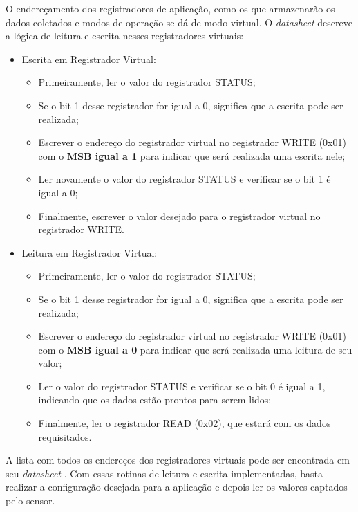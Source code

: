 \documentclass[../monografia.tex]{subfiles}
\begin{document}
O endereçamento dos registradores de aplicação, como os que armazenarão os dados coletados e modos de operação se dá de modo virtual. O \textit{datasheet} descreve a lógica de leitura e escrita nesses registradores virtuais:

\begin{itemize}
\item Escrita em Registrador Virtual:
	\begin{itemize}
		\item Primeiramente, ler o valor do registrador STATUS;
		\item Se o bit 1 desse registrador for igual a 0, significa que a escrita pode ser realizada;
		\item Escrever o endereço do registrador virtual no registrador WRITE (0x01) com o \textbf{MSB igual a 1} para indicar que será realizada uma escrita nele;
		\item Ler novamente o valor do registrador STATUS e verificar se o bit 1 é igual a 0;
		\item Finalmente, escrever o valor desejado para o registrador virtual no registrador WRITE.
	\end{itemize}
	
\item Leitura em Registrador Virtual:
	\begin{itemize}
		\item Primeiramente, ler o valor do registrador STATUS;
		\item Se o bit 1 desse registrador for igual a 0, significa que a escrita pode ser realizada;
		\item Escrever o endereço do registrador virtual no registrador WRITE (0x01) com o \textbf{MSB igual a 0} para indicar que será realizada uma leitura de seu valor;
		\item Ler o valor do registrador STATUS e verificar se o bit 0 é igual a 1, indicando que os dados estão prontos para serem lidos;
		\item Finalmente, ler o registrador READ (0x02), que estará com os dados requisitados.
	\end{itemize}
\end{itemize}

A lista com todos os endereços dos registradores virtuais pode ser encontrada em seu \textit{datasheet} \cite{as7262}. Com essas rotinas de leitura e escrita implementadas, basta realizar a configuração desejada para a aplicação e depois ler os valores captados pelo sensor. 
\end{document}
